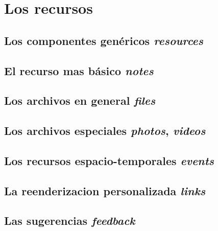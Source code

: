 \chapter{Los recursos}

\section{Los componentes genéricos \emph{resources}}
\section{El recurso mas básico \emph{notes}}
\section{Los archivos en general \emph{files}}
\section{Los archivos especiales \emph{photos}, \emph{videos}}
\section{Los recursos espacio-temporales \emph{events}}
\section{La reenderizacion personalizada \emph{links}}
\section{Las sugerencias \emph{feedback}}
